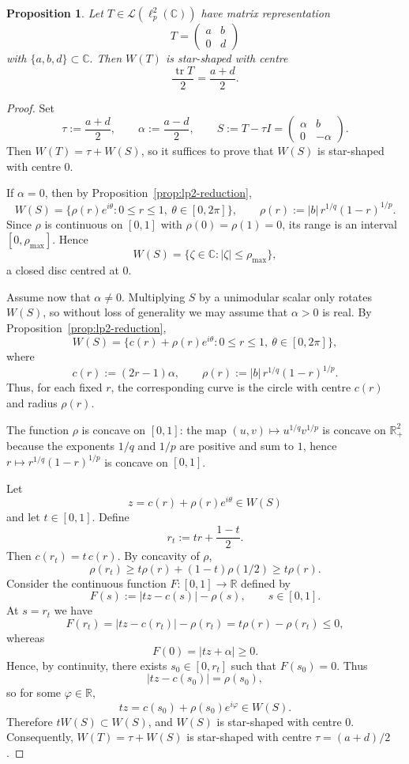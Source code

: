 \documentclass[11pt]{amsart}
\numberwithin{equation}{section}
\newtheorem{proposition}[theorem]{Proposition}
\theoremstyle{definition}
\theoremstyle{remark}
\newcommand{\R}{\mathbb{R}}
\newcommand{\C}{\mathbb{C}}
\begin{document}
\begin{proposition}\label{prop:lp2-triangular-star}
Let $T \in \mathcal L(\ell_p^2(\C))$ have matrix representation 
\[
T=\begin{pmatrix} a & b \\ 0 & d \end{pmatrix}
\]
with $\{a, b, d\} \subset \mathbb C.$
Then $W(T)$ is star-shaped with centre
\[
        \frac{\operatorname{tr}T}{2}=\frac{a+d}{2}.
\]
\end{proposition}

\begin{proof}
 Set
\[
\tau:=\frac{a+d}{2},
\qquad
\alpha:=\frac{a-d}{2},
\qquad
S:=T-\tau I=
\begin{pmatrix}
\alpha & b\\
0 & -\alpha
\end{pmatrix}.
\]
Then $W(T)=\tau+W(S)$, so it suffices to prove that $W(S)$ is star-shaped with centre $0$.

If $\alpha=0$, then by Proposition~\ref{prop:lp2-reduction},
\[
W(S)=\{\rho(r)e^{i\theta}:0\le r\le 1,\ \theta\in [0,2\pi]\},
\qquad
\rho(r):=|b|\,r^{1/q}(1-r)^{1/p}.
\]
Since $\rho$ is continuous on $[0,1]$ with $\rho(0)=\rho(1)=0$, its range is an interval $[0,\rho_{\max}]$. Hence
\[
W(S)=\{\zeta\in\C:|\zeta|\le \rho_{\max}\},
\]
a closed disc centred at $0$.

Assume now that $\alpha\ne 0$. Multiplying $S$ by a unimodular scalar only rotates $W(S)$, so without loss of generality we may assume that $\alpha>0$ is real. By Proposition~\ref{prop:lp2-reduction},
\[
W(S)=\{c(r)+\rho(r)e^{i\theta}:0\le r\le 1,\ \theta\in [0,2\pi]\},
\]
where
\[
c(r):=(2r-1)\alpha,
\qquad
\rho(r):=|b|\,r^{1/q}(1-r)^{1/p}.
\]
Thus, for each fixed \(r\), the corresponding curve is the circle with centre
\(c(r)\) and radius \(\rho(r)\).

The function $\rho$ is concave on $[0,1]$: the map $(u,v)\mapsto u^{1/q}v^{1/p}$ is concave on $\R_+^2$ because the exponents $1/q$ and $1/p$ are positive and sum to $1$, hence $r\mapsto r^{1/q}(1-r)^{1/p}$ is concave on $[0,1]$.

Let
\[
z=c(r)+\rho(r)e^{i\theta}\in W(S)
\]
and let $t\in[0,1]$. Define
\[
r_t:=tr+\frac{1-t}{2}.
\]
Then $c(r_t)=t\,c(r)$. By concavity of $\rho$,
\[
\rho(r_t)\ge t\rho(r)+(1-t)\rho(1/2)\ge t\rho(r).
\]
Consider the continuous function $F: [0,1]\to \mathbb R$ defined by
\[
F(s):=|tz-c(s)|-\rho(s),\qquad s\in[0,1].
\]
At $s=r_t$ we have
\[
F(r_t)=|tz-c(r_t)|-\rho(r_t)=t\rho(r)-\rho(r_t)\le 0,
\]
whereas
\[
F(0)=|tz+\alpha|\ge 0.
\]
Hence, by continuity, there exists $s_0\in[0,r_t]$ such that $F(s_0)=0$. Thus
\[
|tz-c(s_0)|=\rho(s_0),
\]
so for some $\varphi\in\R$,
\[
tz=c(s_0)+\rho(s_0)e^{i\varphi}\in W(S).
\]
Therefore $tW(S)\subset W(S)$, and $W(S)$ is star-shaped with centre $0$.
Consequently, $W(T)=\tau+W(S)$ is star-shaped with centre $\tau=(a+d)/2$.
\end{proof}
\end{document}
